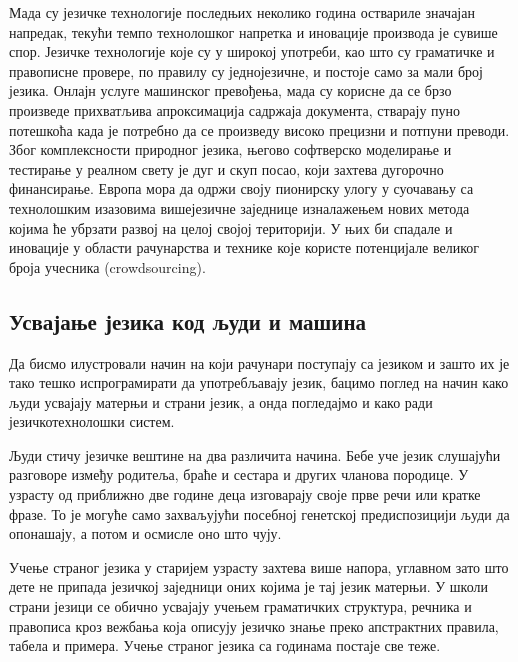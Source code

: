 {\begin{multicols}{2}
Мада су језичке технологије последњих неколико година оствариле значајан напредак, текући темпо технолошког напретка и иновације про\-из\-во\-да је сувише спор. Језичке технологије које су у широкој употреби, као што су граматичке и правописне провере, по правилу су једнојезичне, и постоје само за мали број језика. Онлајн услуге машинског превођења, мада су корисне да се брзо произведе при\-хват\-љи\-ва апроксимација садржаја документа, стварају пуно потешкоћа када је потребно да се произведу високо прецизни и потпуни преводи. Због комплексности природног језика, његово софтверско моделирање и тестирање у реалном свету је дуг и скуп посао, који захтева дугорочно финансирање. Европа мора да одржи своју пионирску улогу у суочавању са технолошким изазовима вишејезичне заједнице изналажењем нових метода којима ће убрзати развој на целој својој територији. У њих би спадале и иновације у области рачунарства и  технике које користе потенцијале великог броја учесника (crowdsourcing). 

\subsection {Усвајање језика код људи и машина}
  
Да бисмо илустровали начин на који рачунари поступају са језиком и зашто их је тако тешко испрограмирати да употребљавају језик, бацимо поглед на начин како људи усвајају матерњи и страни језик, а онда погледајмо и како ради језичкотехнолошки систем. 

Људи стичу језичке вештине на два различита начина. Бебе уче језик слушајући  разговоре између родитеља, браће и сестара и других чланова породице. У узрасту од приближно две године деца изговарају своје прве речи или кратке фразе. То је могуће само захваљујући посебној генетској предиспозицији људи да опонашају, а потом и осмисле оно што чују. 

Учење страног језика у старијем узрасту захтева више напора, углавном зато што дете не припада језичкој заједници оних којима је тај језик матерњи. У школи страни језици се обично усвајају учењем граматичких структура, речника и правописа кроз вежбања која описују језичко знање преко апстрактних правила, табела и примера.  Учење страног језика са годинама постаје све теже. 



\end{multicols}}
